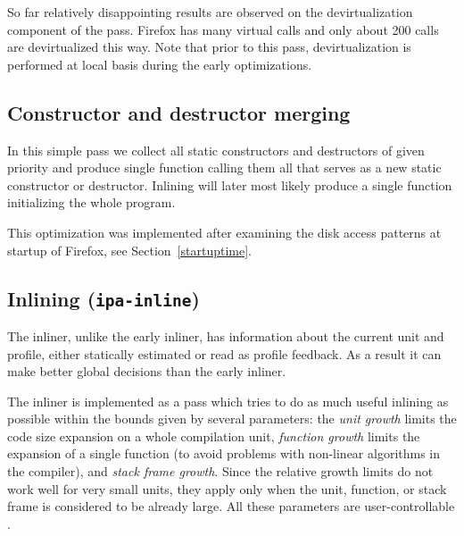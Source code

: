 \documentclass[final]{ols}
\begin{document}
So far relatively disappointing results are observed on the devirtualization
component of the pass. Firefox has many virtual calls and only about 200 calls
are devirtualized this way. Note that prior to this pass, devirtualization is
performed at local basis during the early optimizations.

\subsection{Constructor and destructor merging}
\label{ctororderings}


In this simple pass we collect all static constructors and
destructors of given priority and produce single function calling them
all that serves as a new static constructor or destructor.  Inlining will later
most likely produce a single function initializing the whole program.

This optimization was implemented after examining the disk access patterns
at startup of Firefox, see Section~\ref{startuptime}.  

\subsection{Inlining ({\tt ipa-inline})}
The inliner, unlike the early inliner, has information about the current unit
and profile, either statically estimated or read as profile feedback. As a
result it can make better global decisions than the early inliner.

The inliner is implemented as a pass which tries to do as much useful inlining as possible within
the bounds given by several parameters: the {\em unit growth} limits the code
size expansion on a whole compilation unit, {\em function growth} limits the expansion of
a single function (to avoid problems with non-linear algorithms in the
compiler), and {\em stack frame growth}.  Since the relative growth limits do not
work well for very small units, they apply only when the unit, function, or stack
frame is considered to be already large.  All these parameters are user-controllable
\cite{GCCmanual}.
\end{document}
